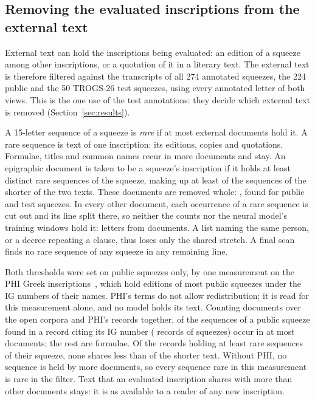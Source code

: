 \documentclass[11pt]{article}
\begin{document}
\subsection{Removing the evaluated inscriptions from the external text}
\label{sec:decontamination}
External text can hold the inscriptions being evaluated: an edition of a squeeze among other inscriptions,
or a quotation of it in a literary text. The external text is therefore filtered against the transcripts of
all 274 annotated squeezes, the 224 public and the 50 TROGS-26 test squeezes, using every annotated letter
of both views. This is the one use of the test annotations: they decide which external text is removed
(Section~\ref{sec:results}).

A 15-letter sequence of a squeeze is \emph{rare} if at most \DeconRare{} external documents hold it.
A rare sequence is text of one inscription: its editions, copies and quotations. Formulae, titles and
common names recur in more documents and stay. An epigraphic document is taken to be a squeeze's
inscription if it holds at least \DeconDropAt{} distinct rare sequences of the squeeze, making up at least
\DeconShare{} of the sequences of the shorter of the two texts. These documents are removed whole:
\DeconDropped{}, found for \DeconPublicFound{} public and \DeconTestFound{} test squeezes. In every other
document, each occurrence of a rare sequence is cut out and its line split there, so neither the counts
nor the neural model's training windows hold it: \DeconCutLetters{} letters from \DeconCutDocuments{}
documents. A list naming the same person, or a decree repeating a clause, thus loses only the shared
stretch. A final scan finds no rare sequence of any squeeze in any remaining line.

Both thresholds were set on public squeezes only, by one measurement on the PHI Greek
inscriptions~\cite{phi}, which hold editions of most public squeezes under the IG numbers of their names.
PHI's terms do not allow redistribution; it is read for this measurement alone, and no model holds its
text. Counting documents over the open corpora and PHI's \DeconCalibPhiDocuments{} records together,
\DeconCalibShare{} of the sequences of a public squeeze found in a record citing its IG number
(\DeconCalibDocuments{} records of \DeconCalibSqueezes{} squeezes) occur in at most \DeconRare{}
documents; the rest are formulae. Of the \DeconCalibEditions{} records holding at least \DeconDropAt{} rare
sequences of their squeeze, none shares less than \DeconCalibShareMin{} of the shorter text. Without PHI,
no sequence is held by more documents, so every sequence rare in this measurement is rare in the filter.
Text that an evaluated inscription shares with more than \DeconRare{} other documents stays: it is as
available to a reader of any new inscription.
\end{document}
